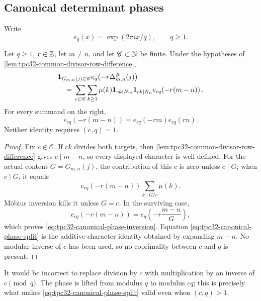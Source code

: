 \subsection{Canonical determinant phases}

Write
\begin{equation}
 e_q(x)=\exp(2\pi i x/q),\qquad q\ge1.
 \label{eq:tpc32-additive-character}
\end{equation}

\begin{theorem}
\label{thm:tpc32-canonical-phase-splitting}
Let \(q\ge1\), \(r\in\mathbb Z\), let \(m\ne n\), and let
\(\mathscr C\subset\mathbb N\) be finite.  Under the hypotheses of
\cref{lem:tpc32-common-divisor-row-difference},
\begin{align}
 &\mathbf 1_{G_{m,n}(j)\in\mathscr C}
 e_q\!\left(-r\Delta^\#_{m,n}(j)\right)
 \notag\\
 &\quad={}
 \sum_{c\in\mathscr C}\sum_{k\ge1}\mu(k)
 \mathbf 1_{ck\mid N_m}\mathbf 1_{ck\mid N_n}
 e_{cq}\!\left(-r(m-n)\right).
 \label{eq:tpc32-canonical-phase-inversion}
\end{align}
For every summand on the right,
\begin{equation}
 \boxed{
 e_{cq}\!\left(-r(m-n)\right)
 =e_{cq}(-rm)e_{cq}(rn).}
 \label{eq:tpc32-canonical-phase-split}
\end{equation}
Neither identity requires \((c,q)=1\).
\end{theorem}

\begin{proof}
Fix \(c\in\mathscr C\).  If \(ck\) divides both targets, then
\cref{lem:tpc32-common-divisor-row-difference} gives \(c\mid m-n\),
so every displayed character is well defined.  For the actual content
\(G=G_{m,n}(j)\), the contribution of this \(c\) is zero unless
\(c\mid G\); when \(c\mid G\), it equals
\[
 e_{cq}\!\left(-r(m-n)\right)
 \sum_{k\mid G/c}\mu(k).
\]
M\"obius inversion kills it unless \(G=c\).  In the surviving case,
\[
 e_{cq}\!\left(-r(m-n)\right)
 =e_q\!\left(-r\frac{m-n}{G}\right),
\]
which proves \eqref{eq:tpc32-canonical-phase-inversion}.  Equation
\eqref{eq:tpc32-canonical-phase-split} is the additive-character
identity obtained by expanding \(m-n\).  No modular inverse of \(c\)
has been used, so no coprimality between \(c\) and \(q\) is present.
\end{proof}

\begin{remark}
It would be incorrect to replace division by \(c\) with multiplication
by an inverse of \(c\pmod q\).  The phase is lifted from modulus \(q\)
to modulus \(cq\); this is precisely what makes
\eqref{eq:tpc32-canonical-phase-split} valid even when \((c,q)>1\).
\end{remark}

